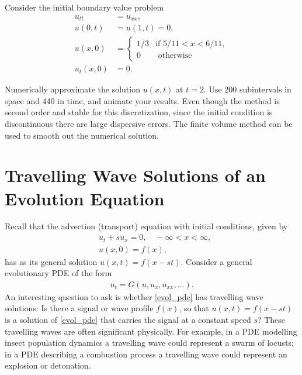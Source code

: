 \begin{problem}
	Consider the initial boundary value problem 
	\begin{align*}
		u_{tt} &= u_{xx}, \\
		u(0,t) &= u(1,t) = 0, \\
		u(x,0) &= \begin{cases} 1/3 & \text{if } 5/11 < x < 6/11,\\
		0 & \text{ otherwise}
		\end{cases}\\ 
		u_t(x,0) &= 0.
	\end{align*}

	Numerically approximate the solution $u(x,t)$ at $t = 2$.  Use 200 subintervals in space and 440 in time, and animate your results.  Even though the method is second order and stable for this discretization, since the initial condition is discontinuous there are large dispersive errors.  The finite volume method can be used to smooth out the numerical solution. 
\end{problem}




\section*{Travelling Wave Solutions of an Evolution Equation}
Recall that the advection (transport) equation with initial conditions, given by
\begin{align*}
	&{ }u_t + su_x  = 0, \quad -\infty < x < \infty, \\
	&{ }u(x,0) = f(x),
\end{align*}
has as its general solution $u(x,t) = f(x -st)$.
Consider a general evolutionary PDE of the form 
\begin{align}
u_t = G(u,u_x, u_{xx}, \ldots). \label{evol_pde}
\end{align}
An interesting question to ask is whether \eqref{evol_pde} has travelling wave solutions: Is there a signal or wave profile $f(x)$, so that $u(x,t) = f(x-st)$ is a solution of \eqref{evol_pde} that carries the signal at a constant speed $s$?  These travelling waves are often significant physically.  For example, in a PDE modelling insect population dynamics a travelling wave could represent a swarm of locusts; in a PDE describing a combustion process a travelling wave could represent an explosion or detonation. 


% 
% 

